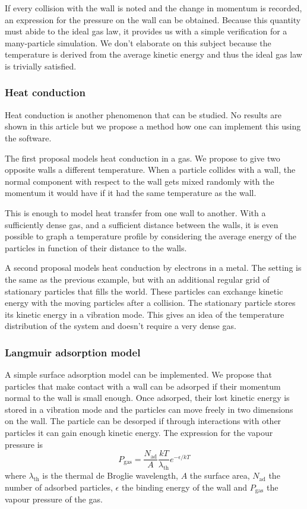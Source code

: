 If every collision with the wall is noted and the change in momentum is 
recorded, an expression for the pressure on the wall can be obtained. Because 
this quantity must abide to the ideal gas law, it provides us with a simple 
verification for a many-particle simulation. We don't elaborate on this subject 
because the temperature is derived from the average kinetic energy and thus the 
ideal gas law is trivially satisfied.

\subsubsection{Heat conduction}

Heat conduction is another phenomenon that can be studied. No results are shown 
in this article but we propose a method how one can implement this using the 
software.

The first proposal models heat conduction in a gas. We propose to give two 
opposite walls a different temperature. When a particle collides with a 
wall, the normal component with respect to the wall gets mixed randomly 
with the momentum it would have if it had the same temperature as the wall.  

This is enough to model heat transfer from one wall to another. With a 
sufficiently dense gas, and a sufficient distance between the walls, it is 
even possible to graph a temperature profile by considering the average 
energy of the particles in function of their distance to the walls.

A second proposal models heat conduction by electrons in a metal. The 
setting is the same as the previous example, but with an additional regular 
grid of stationary particles that fills the world. These particles can 
exchange kinetic energy with the moving particles after a collision. The 
stationary particle stores its kinetic energy in a vibration mode. This 
gives an idea of the temperature distribution of the system and doesn't 
require a very dense gas.

\subsubsection{Langmuir adsorption model}

A simple surface adsorption model can be implemented. We propose that particles 
that make contact with a wall can be adsorped if their momentum normal to the 
wall is small enough. Once adsorped, their lost kinetic energy is stored in a 
vibration mode and the particles can move freely in two dimensions on the wall.  
The particle can be desorped if through interactions with other particles it 
can gain enough kinetic energy. The expression for the vapour pressure is 
\cite{adsorptionModel}
$$
P_{\textrm{gas}} = 
\frac{N_{\textrm{ad}}}{A}\frac{kT}{\lambda_{\textrm{th}}}e^{-\epsilon/kT}
$$
where $\lambda_{\textrm{th}}$ is the thermal de Broglie wavelength, $A$ the 
surface area, $N_{\textrm{ad}}$ the number of adsorbed particles, $\epsilon$ 
the binding energy of the wall and $P_{\textrm{gas}}$ the vapour pressure of 
the gas.
